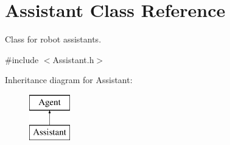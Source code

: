 \hypertarget{classAssistant}{\section{Assistant Class Reference}
\label{classAssistant}
}


Class for robot assistants.  




{\ttfamily \#include $<$Assistant.\-h$>$}

Inheritance diagram for Assistant\-:\begin{figure}[H]
\begin{center}
\leavevmode
\includegraphics[height=2.000000cm]{classAssistant}
\end{center}
\end{figure}
